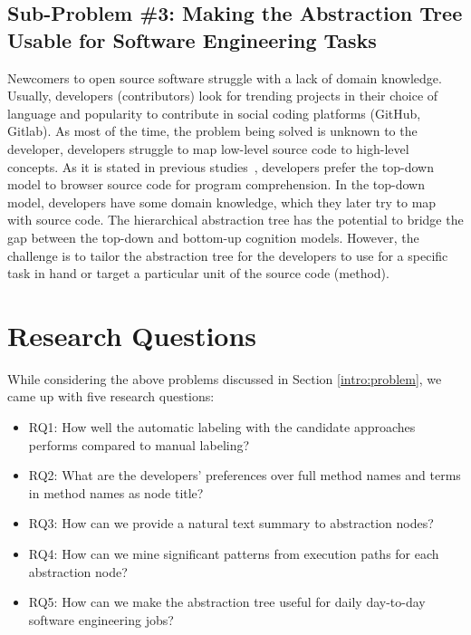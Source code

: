    
    \subsection{Sub-Problem \#3: Making the Abstraction Tree Usable for Software Engineering Tasks} 
    
    Newcomers to open source software struggle with a lack of domain knowledge. Usually, developers (contributors) look for trending projects in their choice of language and popularity to contribute in social coding platforms (GitHub, Gitlab). As most of the time, the problem being solved is unknown to the developer, developers struggle to map low-level source code to high-level concepts. As it is stated in previous studies~\cite{brooks1983theoryComprehensionPrograms}, developers prefer the top-down model to browser source code for program comprehension. In the top-down model, developers have some domain knowledge, which they later try to map with source code. The hierarchical abstraction tree has the potential to bridge the gap between the top-down and bottom-up cognition models. However, the challenge is to tailor the abstraction tree for the developers to use for a specific task in hand or target a particular unit of the source code (method). 
    
    
\section{Research Questions}   
\label{intro:research_questions}
While considering the above problems discussed in Section \ref{intro:problem}, we came up with five research questions:
\begin{itemize}
    \item RQ1: How well the automatic labeling with the candidate approaches performs compared to manual labeling?
    \item RQ2: What are the developers' preferences over full method names and terms in method names as node title?
    \item RQ3: How can we provide a natural text summary to abstraction nodes?
    \item RQ4: How can we mine significant patterns from execution paths for each abstraction node?
    \item RQ5: How can we make the abstraction tree useful for daily day-to-day software engineering jobs?
    
\end{itemize}

